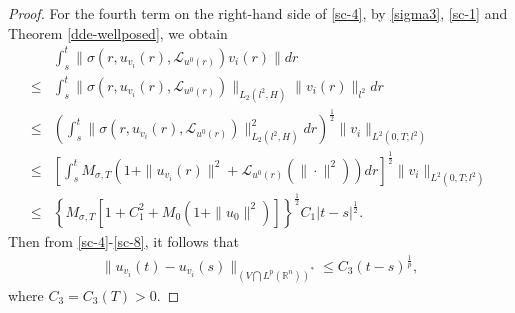 \documentclass[10pt,a4paper]{amsart}
\def\leq{\leqslant}
\begin{document}
\begin{proof}
    For the fourth term on the right-hand side of \eqref{sc-4},
    by \eqref{sigma3}, \eqref{sc-1} and Theorem \ref{dde-wellposed}, we obtain
    \begin{align} \label{sc-8}
        & \int_s^t \| \sigma(r, u_{v_i}(r), \mathcal{L}_{u^0(r)} ) v_i(r) \| dr  \nonumber \\
        \leq & \int_s^t \| \sigma(r, u_{v_i}(r), \mathcal{L}_{u^0(r)} ) \|_{L_2(l^2, H)}  \| v_i(r) \|_{l^2} dr  \nonumber \\
        \leq & \left( \int_s^t \| \sigma(r, u_{v_i}(r), \mathcal{L}_{u^0(r)} ) \|_{L_2(l^2, H)}^2 dr \right)^{\frac{1}{2}}
        \| v_i \|_{L^2(0,T; l^2)}  \nonumber \\
        \leq & \left[ \int_s^t M_{\sigma, T}
        \left( 1 + \| u_{v_i}(r)\|^2
        + \mathcal{L}_{u^0(r)}(\|\cdot\|^2)
        \right)
        dr
        \right]^{\frac{1}{2}}
        \| v_i \|_{L^2(0,T; l^2)}  \nonumber \\
        \leq & \left\{ M_{\sigma, T} \left[ 1 + C_1^2 + M_0 \left( 1 + \|u_0\|^2 \right) \right] \right\}^{\frac{1}{2}}
        C_1 |t-s|^{\frac{1}{2}}.
    \end{align}
    Then from \eqref{sc-4}-\eqref{sc-8},
    it follows that
    \begin{align} \label{sc-9}
        \| u_{v_i} (t) - u_{v_i} (s) \|_{\left( V \bigcap L^p(\mathbb{R}^n) \right)^\ast}
        \leq C_3 (t-s)^{\frac{1}{p}},
    \end{align}
    where $C_3 = C_3(T) > 0$.



\end{proof}
\end{document}
